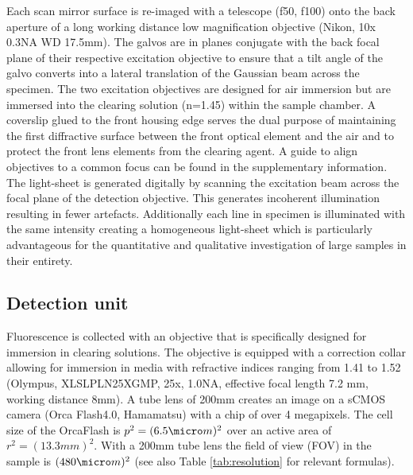 \documentclass[12pt]{spieman}  %
\begin{document}
Each scan mirror surface is re-imaged with a telescope (f50, f100) onto the back aperture of a long working distance low magnification objective (Nikon, 10x 0.3NA WD 17.5mm).  The galvos are in planes conjugate with the back focal plane of their respective excitation objective to ensure that a tilt angle of the galvo converts into a lateral translation of the Gaussian beam across the specimen. The two excitation objectives are designed for air immersion but are immersed into the clearing solution (n=1.45) within the sample chamber. A coverslip glued to the front housing edge serves the dual purpose of maintaining the first diffractive surface between the front optical element and the air and to protect the front lens elements from the clearing agent. A guide to align objectives to a common focus can be found in the supplementary information. The light-sheet is generated digitally\cite{Keller2008a,Keller2008b} by scanning the excitation beam across the focal plane of the detection objective. This generates incoherent illumination resulting in fewer artefacts. %
Additionally each line in specimen is illuminated with the same intensity creating a homogeneous light-sheet which is particularly advantageous for the quantitative and qualitative investigation of large samples in their entirety.

\subsection{Detection unit}
			
Fluorescence is collected with an objective that is specifically designed for immersion in clearing solutions. The objective is equipped with a correction collar allowing for immersion in media with refractive indices ranging from 1.41 to 1.52 (Olympus, XLSLPLN25XGMP, 25x, 1.0NA, effective focal length 7.2 mm, working distance 8mm). %
A tube lens of 200mm creates an image on a sCMOS camera (Orca Flash4.0, Hamamatsu) with a chip of over 4 megapixels. %
The cell size of the OrcaFlash is $p^2= (6.5\micro m)^2$ over an active area of $r^2= (13.3mm)^2$. With a 200mm tube lens the field of view (FOV) in the sample is $(480\micro m)^2$ (see also Table \ref{tab:resolution} for relevant formulas). 
\end{document}
